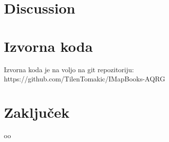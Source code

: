 \documentclass[journal]{IEEEtran}
\begin{document}
\section{Discussion}

\section{Izvorna koda}
Izvorna koda je na voljo na git repozitoriju: https://github.com/TilenTomakic/IMapBooks-AQRG

\section{Zaključek}
oo~\cite{adhya2016automated}

\ifCLASSOPTIONcaptionsoff
  \newpage
\fi



\end{document}
